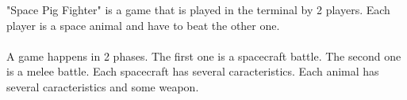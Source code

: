 "Space Pig Fighter" is a game that is played in the terminal by 2 players. Each player is a space animal and have to beat the other one.\\ 
\\
A game happens in 2 phases. The first one is a spacecraft battle. The second one is a melee battle.
Each spacecraft has several caracteristics. 
Each animal has several caracteristics and some weapon. \\
